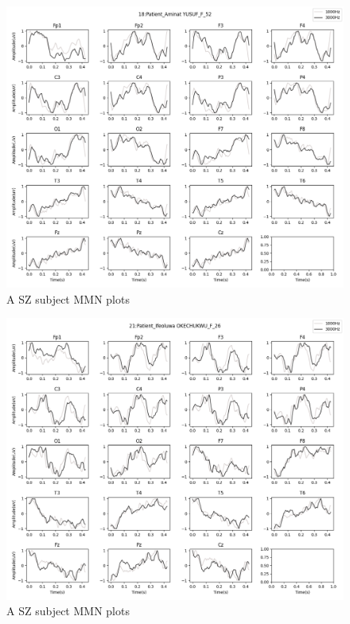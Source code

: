 \documentclass[10pt]{article}
\begin{document}
\begin{figure}[H]
  \includegraphics[width=16cm]{../../../data_analysis_results/MMN/time_series/Patient/18.png}
  \caption{A SZ subject MMN plots}
\end{figure}
\begin{figure}[H]
  \includegraphics[width=16cm]{../../../data_analysis_results/MMN/time_series/Patient/21.png}
  \caption{A SZ subject MMN plots}
\end{figure}
\end{document}
